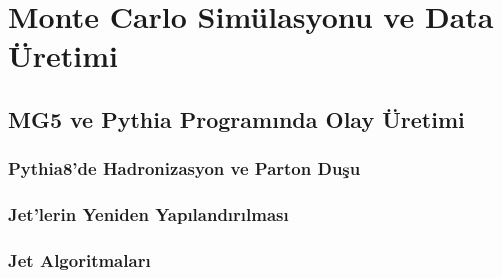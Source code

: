 \chapter{Monte Carlo Simülasyonu ve Data Üretimi}
\section{MG5 ve Pythia Programında Olay Üretimi}
\lipsum[2-3]
\subsection{Pythia8'de Hadronizasyon ve Parton Duşu}
\lipsum[2-3]
\subsection{Jet'lerin Yeniden Yapılandırılması}
\lipsum[2-3]
\subsection{Jet Algoritmaları}
\lipsum[2-3]
